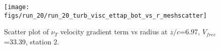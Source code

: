 \begin{figure}[H]
\centering
\texttt{[image: figs/run\_20/run\_20\_turb\_visc\_ettap\_bot\_vs\_r\_meshscatter]}
\caption{Scatter plot of $\nu_T$ velocity gradient term vs radius at $z/c$=6.97, $V_{free}$=33.39, station 2.}
\label{fig:run_20_turb_visc_ettap_bot_vs_r_meshscatter}
\end{figure}


